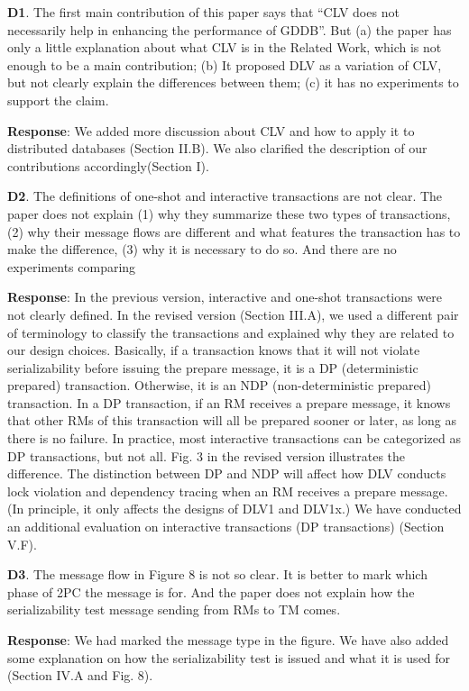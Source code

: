 \documentclass[conference]{IEEEtran}
\begin{document}
\begin{frame}{\relax}
\textbf{D1}. The first main contribution of this paper says that “CLV does not necessarily help in enhancing the performance of GDDB”. But (a) the paper has only a little explanation about what CLV is in the Related Work, which is not enough to be a main contribution; (b) It proposed DLV as a variation of CLV, but not clearly explain the differences between them; (c) it has no experiments to support the claim.

\textbf{Response}: We added more discussion about CLV and how to apply it to distributed databases (Section II.B). We also clarified the description of our contributions accordingly(Section I).

\textbf{D2}. The definitions of one-shot and interactive transactions are not clear. The paper does not explain (1) why they summarize these two types of transactions, (2) why their message flows are different and what features the transaction has to make the difference, (3) why it is necessary to do so. And there are no experiments comparing

\textbf{Response}: In the previous version, interactive and one-shot transactions were not clearly defined. In the revised version (Section III.A), we used a different pair of terminology to classify the transactions and explained why they are related to our design choices. 
Basically, if a transaction knows that it will not violate serializability before issuing the prepare message, it is a DP (deterministic prepared) transaction. Otherwise, it is an NDP (non-deterministic prepared) transaction. In a DP transaction, if an RM receives a prepare message, it knows that other RMs of this transaction will all be prepared sooner or later, as long as there is no failure. In practice, most interactive transactions can be categorized as DP transactions, but not all. Fig. 3 in the revised version illustrates the difference. The distinction between DP and NDP will affect how DLV conducts lock violation and dependency tracing when an RM receives a prepare message. (In principle, it only affects the designs of DLV1 and DLV1x.)
We have conducted an additional evaluation on interactive transactions (DP transactions) (Section V.F).

\textbf{D3}. The message flow in Figure 8 is not so clear. It is better to mark which phase of 2PC the message is for. And the paper does not explain how the serializability test message sending from RMs to TM comes.

\textbf{Response}: We had marked the message type in the figure. We have also added some explanation on how the serializability test is issued and what it is used for (Section IV.A and Fig. 8).


\end{frame}
\end{document}
